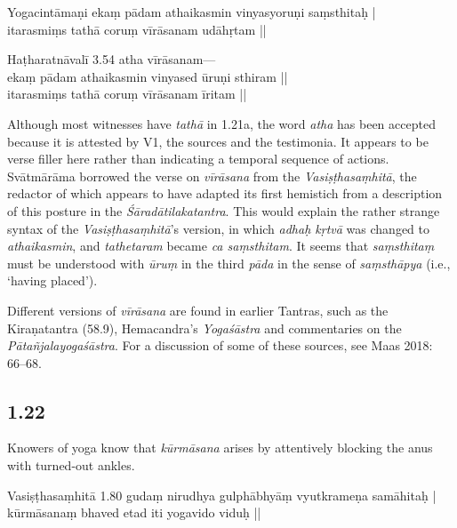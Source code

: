 \begin{ekdosis}
\begin{testimonia}[hp01_021]
Yogacintāmaṇi
\startverse
ekaṃ pādam athaikasmin vinyasyoruṇi saṃsthitaḥ |\\
itarasmiṃs tathā coruṃ vīrāsanam udāhṛtam ||
\endverse

Haṭharatnāvalī 3.54
\startverse
atha vīrāsanam---\\
ekaṃ pādam athaikasmin vinyased ūruṇi sthiram ||\\
itarasmiṃs tathā coruṃ vīrāsanam īritam || 
\endverse
\end{testimonia}

\begin{philcomm}[hp01_021]   
Although most witnesses have \emph{tathā} in 1.21a, the word \emph{atha} has been accepted because it is attested by V1, the sources and the testimonia. It appears to be verse filler here rather than indicating a temporal sequence of actions. Svātmārāma borrowed the verse on \emph{vīrāsana} from the \emph{Vasiṣṭhasaṃhitā}, the redactor of which appears to have adapted its first hemistich from a description of this posture in the \emph{Śāradātilakatantra}. This would explain the rather strange syntax of the \emph{Vasiṣṭhasaṃhitā}’s version, in which \emph{adhaḥ kṛtvā} was changed to \emph{athaikasmin}, and \emph{tathetaram} became \emph{ca saṃsthitam}. It seems that \emph{saṃsthitaṃ} must be understood with \emph{ūruṃ} in the third \emph{pāda} in the sense of \emph{saṃsthāpya} (i.e., ‘having placed’).

Different versions of \emph{vīrāsana} are found in earlier Tantras, such as the Kiraṇatantra (58.9), Hemacandra’s \emph{Yogaśāstra} and commentaries on the \emph{Pātañjalayogaśāstra}. For a discussion of some of these sources, see Maas 2018: 66–68.
\end{philcomm}

\subsection*{1.22}
\begin{translation}[hp01_022]
Knowers of yoga know that \emph{kūrmāsana} arises by attentively blocking the anus with turned-out ankles.
\end{translation}

\begin{sources}[hp01_022]
Vasiṣṭhasaṃhitā 1.80
\startverse
gudaṃ nirudhya gulphābhyāṃ vyutkrameṇa samāhitaḥ |\\
kūrmāsanaṃ bhaved etad iti yogavido viduḥ ||
\endverse


\end{sources}
\end{ekdosis}
